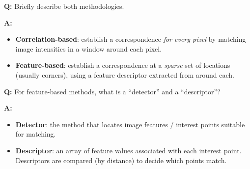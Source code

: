 \begin{exbox}
\textbf{Q:} Briefly describe both methodologies.

\textbf{A:}
\begin{itemize}
  \item \textbf{Correlation-based}: establish a correspondence \emph{for every pixel} by matching image intensities in a window around each pixel.
  \item \textbf{Feature-based}: establish a correspondence at a \emph{sparse} set of locations (usually corners), using a feature descriptor extracted from around each.
\end{itemize}
\end{exbox}

\begin{exbox}
\textbf{Q:} For feature-based methods, what is a ``detector'' and a ``descriptor''?

\textbf{A:}
\begin{itemize}
  \item \textbf{Detector}: the method that locates image features / interest points suitable for matching.
  \item \textbf{Descriptor}: an array of feature values associated with each interest point. Descriptors are compared (by distance) to decide which points match.
\end{itemize}
\end{exbox}

